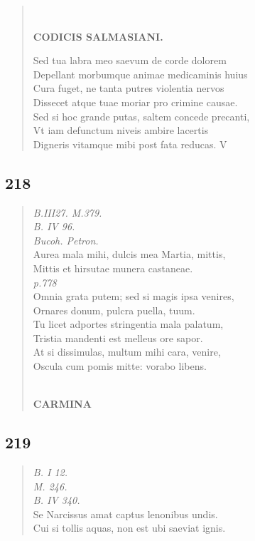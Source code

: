 \documentclass[11pt, a4paper]{report}
\begin{document}
\begin{verse}
        ﻿\pagebreak 
    \begin{center} \textbf{CODICIS SALMASIANI.} \end{center} \marginpar{[185]} Sed tua labra meo saevum de corde dolorem \\ Depellant morbumque animae medicaminis huius \\ Cura fuget, ne tanta putres violentia nervos \\ Dissecet atque tuae moriar pro crimine causae. \\ Sed si hoc grande putas, saltem concede precanti, \\ Vt iam defunctum niveis ambire lacertis \\ Digneris vitamque mibi post fata reducas. V \\ 
      \end{verse}
  
            \subsection*{218}
      \begin{verse}
      \textit{B.III27. M.379.} \\ \textit{B. IV 96.} \\ \textit{Bucoh. Petron.} \\ Aurea mala mihi, dulcis mea Martia, mittis, \\ Mittis et hirsutae munera castaneae. \\ \textit{p.778} \\ Omnia grata putem; sed si magis ipsa venires, \\ Ornares donum, pulcra puella, tuum. \\ Tu licet adportes stringentia mala palatum, \\ Tristia mandenti est melleus ore sapor. \\ At si dissimulas, multum mihi cara, venire, \\ Oscula cum pomis mitte: vorabo libens. \\ 
        ﻿\pagebreak 
     \marginpar{[186]} \begin{center} \textbf{CARMINA} \end{center}
      \end{verse}
  
            \subsection*{219}
      \begin{verse}
      \textit{B. I 12.} \\ \textit{M. 246.} \\ \textit{B. IV 340.} \\ Se Narcissus amat captus lenonibus undis. \\ Cui si tollis aquas, non est ubi saeviat ignis. \\ 
      \end{verse}
  
\end{document}
